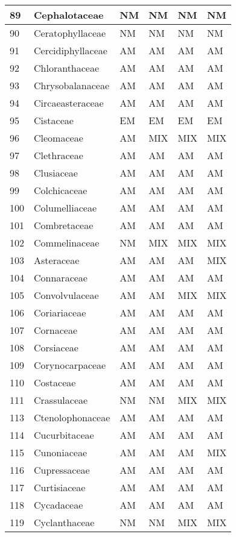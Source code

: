 \documentclass[]{article}
\begin{document}
\begin{longtable}{l|l|l|l|l|l}
\hline
89 & Cephalotaceae & NM & NM & NM & NM\\
\hline
90 & Ceratophyllaceae & NM & NM & NM & NM\\
\hline
91 & Cercidiphyllaceae & AM & AM & AM & AM\\
\hline
92 & Chloranthaceae & AM & AM & AM & AM\\
\hline
93 & Chrysobalanaceae & AM & AM & AM & AM\\
\hline
94 & Circaeasteraceae & AM & AM & AM & AM\\
\hline
95 & Cistaceae & EM & EM & EM & EM\\
\hline
96 & Cleomaceae & AM & MIX & MIX & MIX\\
\hline
97 & Clethraceae & AM & AM & AM & AM\\
\hline
98 & Clusiaceae & AM & AM & AM & AM\\
\hline
99 & Colchicaceae & AM & AM & AM & AM\\
\hline
100 & Columelliaceae & AM & AM & AM & AM\\
\hline
101 & Combretaceae & AM & AM & AM & AM\\
\hline
102 & Commelinaceae & NM & MIX & MIX & MIX\\
\hline
103 & Asteraceae & AM & AM & AM & MIX\\
\hline
104 & Connaraceae & AM & AM & AM & AM\\
\hline
105 & Convolvulaceae & AM & AM & MIX & MIX\\
\hline
106 & Coriariaceae & AM & AM & AM & AM\\
\hline
107 & Cornaceae & AM & AM & AM & AM\\
\hline
108 & Corsiaceae & AM & AM & AM & AM\\
\hline
109 & Corynocarpaceae & AM & AM & AM & AM\\
\hline
110 & Costaceae & AM & AM & AM & AM\\
\hline
111 & Crassulaceae & NM & NM & MIX & MIX\\
\hline
113 & Ctenolophonaceae & AM & AM & AM & AM\\
\hline
114 & Cucurbitaceae & AM & AM & AM & AM\\
\hline
115 & Cunoniaceae & AM & AM & AM & MIX\\
\hline
116 & Cupressaceae & AM & AM & AM & AM\\
\hline
117 & Curtisiaceae & AM & AM & AM & AM\\
\hline
118 & Cycadaceae & AM & AM & AM & AM\\
\hline
119 & Cyclanthaceae & NM & NM & MIX & MIX\\

\end{longtable}
\end{document}
